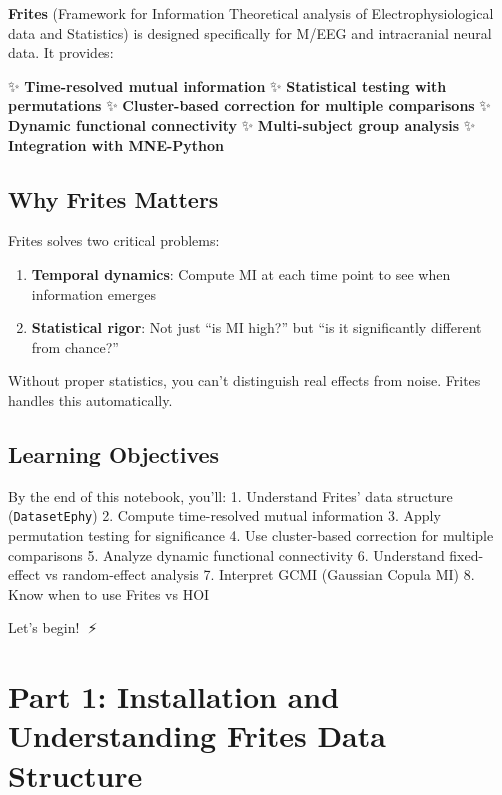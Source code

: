 \documentclass[
  11pt,
  letterpaper,
  oneside,
  openany]{book}
\providecommand{\tightlist}{%
  \setlength{\itemsep}{0pt}\setlength{\parskip}{0pt}}
\begin{document}
\textbf{Frites} (Framework for Information Theoretical analysis of
Electrophysiological data and Statistics) is designed specifically for
M/EEG and intracranial neural data. It provides:

✨ \textbf{Time-resolved mutual information} ✨ \textbf{Statistical
testing with permutations} ✨ \textbf{Cluster-based correction for
multiple comparisons} ✨ \textbf{Dynamic functional connectivity} ✨
\textbf{Multi-subject group analysis} ✨ \textbf{Integration with
MNE-Python}

\subsection{Why Frites Matters}\label{why-frites-matters}

Frites solves two critical problems:

\begin{enumerate}
\def\labelenumi{\arabic{enumi}.}
\tightlist
\item
  \textbf{Temporal dynamics}: Compute MI at each time point to see when
  information emerges
\item
  \textbf{Statistical rigor}: Not just ``is MI high?'' but ``is it
  significantly different from chance?''
\end{enumerate}

Without proper statistics, you can't distinguish real effects from
noise. Frites handles this automatically.

\subsection{Learning Objectives}\label{learning-objectives-2}

By the end of this notebook, you'll: 1. Understand Frites' data
structure (\texttt{DatasetEphy}) 2. Compute time-resolved mutual
information 3. Apply permutation testing for significance 4. Use
cluster-based correction for multiple comparisons 5. Analyze dynamic
functional connectivity 6. Understand fixed-effect vs random-effect
analysis 7. Interpret GCMI (Gaussian Copula MI) 8. Know when to use
Frites vs HOI

Let's begin! 🧠⚡

\section{Part 1: Installation and Understanding Frites Data
Structure}\label{part-1-installation-and-understanding-frites-data-structure}
\end{document}
